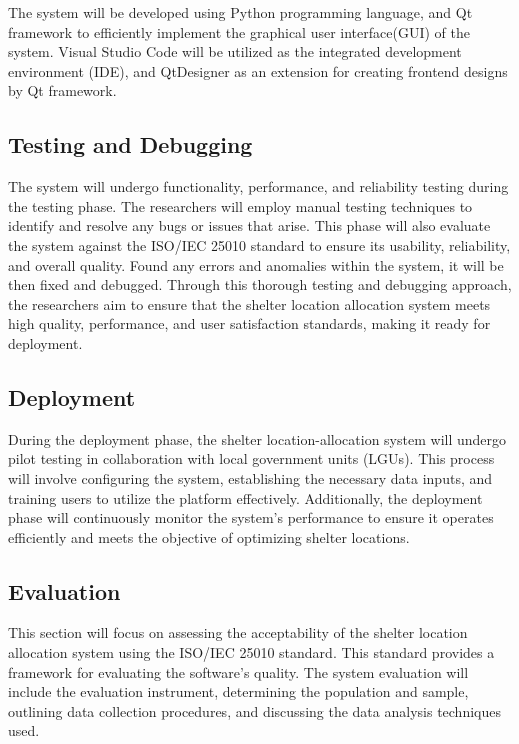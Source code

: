 	The system will be developed using Python programming language, and Qt framework to efficiently implement the graphical user interface(GUI) of the system. Visual Studio Code will be utilized as the integrated development environment (IDE), and QtDesigner as an extension for creating frontend designs by Qt framework.
	
\subsection{Testing and Debugging}
	The system will undergo functionality, performance, and reliability testing during the testing phase. The researchers will employ manual testing techniques to identify and resolve any bugs or issues that arise. This phase will also evaluate the system against the ISO/IEC 25010 standard to ensure its usability, reliability, and overall quality. Found any errors and anomalies within the system, it will be then fixed and debugged. Through this thorough testing and debugging approach, the researchers aim to ensure that the shelter location allocation system meets high quality, performance, and user satisfaction standards, making it ready for deployment.
	
\subsection{Deployment}
	During the deployment phase, the shelter location-allocation system will undergo pilot testing in collaboration with local government units (LGUs). This process will involve configuring the system, establishing the necessary data inputs, and training users to utilize the platform effectively. Additionally, the deployment phase will continuously monitor the system's performance to ensure it operates efficiently and meets the objective of optimizing shelter locations. 
	
\subsection{Evaluation}
	This section will focus on assessing the acceptability of the shelter location allocation system using the ISO/IEC 25010 standard. This standard provides a framework for evaluating the software's quality. The system evaluation will include the evaluation instrument, determining the population and sample, outlining data collection procedures, and discussing the data analysis techniques used.

